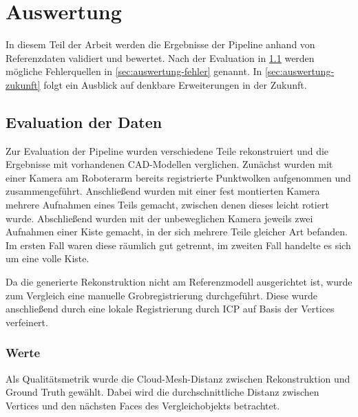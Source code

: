
\chapter{Auswertung}
\label{ch:auswertung}

In diesem Teil der Arbeit werden die Ergebnisse der Pipeline anhand von Referenzdaten validiert und bewertet.
Nach der Evaluation in \ref{sec:auswertung-daten} werden mögliche Fehlerquellen in \ref{sec:auswertung-fehler} genannt.
In \ref{sec:auswertung-zukunft} folgt ein Ausblick auf denkbare Erweiterungen in der Zukunft.



\section{Evaluation der Daten}
\label{sec:auswertung-daten}

Zur Evaluation der Pipeline wurden verschiedene Teile rekonstruiert und die Ergebnisse mit vorhandenen CAD-Modellen verglichen.
Zunächst wurden mit einer Kamera am Roboterarm bereits registrierte Punktwolken aufgenommen und zusammengeführt.
Anschließend wurden mit einer fest montierten Kamera mehrere Aufnahmen eines Teils gemacht, zwischen denen dieses leicht rotiert wurde.
Abschließend wurden mit der unbeweglichen Kamera jeweils zwei Aufnahmen einer Kiste gemacht, in der sich mehrere Teile gleicher Art befanden.
Im ersten Fall waren diese räumlich gut getrennt, im zweiten Fall handelte es sich um eine volle Kiste.

Da die generierte Rekonstruktion nicht am Referenzmodell ausgerichtet ist, wurde zum Vergleich eine manuelle Grobregistrierung durchgeführt.
Diese wurde anschließend durch eine lokale Registrierung durch ICP auf Basis der Vertices verfeinert.


\subsection{Werte}
\label{subsec:auswertung-daten-werte}

Als Qualitätsmetrik wurde die Cloud-Mesh-Distanz zwischen Rekonstruktion und Ground Truth gewählt.
Dabei wird die durchschnittliche Distanz zwischen Vertices und den nächsten Faces des Vergleichobjekts betrachtet.

